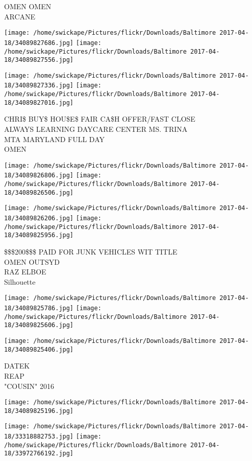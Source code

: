 \documentclass[10pt,letterpaper]{article}
\begin{document}
OMEN OMEN\\
ARCANE
\pagebreak

\texttt{[image: /home/swickape/Pictures/flickr/Downloads/Baltimore 2017-04-18/34089827686.jpg]}
\texttt{[image: /home/swickape/Pictures/flickr/Downloads/Baltimore 2017-04-18/34089827556.jpg]}

\texttt{[image: /home/swickape/Pictures/flickr/Downloads/Baltimore 2017-04-18/34089827336.jpg]}
\texttt{[image: /home/swickape/Pictures/flickr/Downloads/Baltimore 2017-04-18/34089827016.jpg]}

CHRI\$ BUY\$ HOU\$E\$ FAIR CA\$H OFFER/FAST CLOSE\\
ALWAYS LEARNING DAYCARE CENTER MS. TRINA\\
MTA MARYLAND FULL DAY\\
OMEN
\pagebreak

\texttt{[image: /home/swickape/Pictures/flickr/Downloads/Baltimore 2017-04-18/34089826806.jpg]}
\texttt{[image: /home/swickape/Pictures/flickr/Downloads/Baltimore 2017-04-18/34089826506.jpg]}

\texttt{[image: /home/swickape/Pictures/flickr/Downloads/Baltimore 2017-04-18/34089826206.jpg]}
\texttt{[image: /home/swickape/Pictures/flickr/Downloads/Baltimore 2017-04-18/34089825956.jpg]}

\$\$\$200\$\$\$ PAID FOR JUNK VEHICLES WIT TITLE\\
OMEN OUTSYD\\
RAZ ELBOE\\
Silhouette
\pagebreak

\texttt{[image: /home/swickape/Pictures/flickr/Downloads/Baltimore 2017-04-18/34089825786.jpg]}
\texttt{[image: /home/swickape/Pictures/flickr/Downloads/Baltimore 2017-04-18/34089825606.jpg]}

\vspace{0.25in}
\texttt{[image: /home/swickape/Pictures/flickr/Downloads/Baltimore 2017-04-18/34089825406.jpg]}

DATEK\\
REAP\\
"COUSIN" 2016
\pagebreak

\texttt{[image: /home/swickape/Pictures/flickr/Downloads/Baltimore 2017-04-18/34089825196.jpg]}

\vspace{0.25in}
\texttt{[image: /home/swickape/Pictures/flickr/Downloads/Baltimore 2017-04-18/33318882753.jpg]}
\texttt{[image: /home/swickape/Pictures/flickr/Downloads/Baltimore 2017-04-18/33972766192.jpg]}
\end{document}
